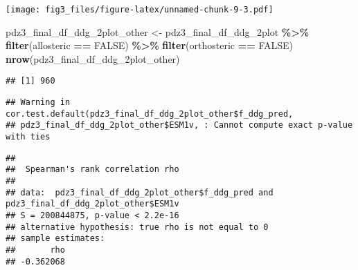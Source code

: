 \documentclass[
]{article}
\newenvironment{Shaded}{\begin{snugshade}}{\end{snugshade}}
\newcommand{\AttributeTok}[1]{\textcolor[rgb]{0.13,0.29,0.53}{#1}}
\newcommand{\CommentTok}[1]{\textcolor[rgb]{0.56,0.35,0.01}{\textit{#1}}}
\newcommand{\ConstantTok}[1]{\textcolor[rgb]{0.56,0.35,0.01}{#1}}
\newcommand{\FunctionTok}[1]{\textcolor[rgb]{0.13,0.29,0.53}{\textbf{#1}}}
\newcommand{\NormalTok}[1]{#1}
\newcommand{\OtherTok}[1]{\textcolor[rgb]{0.56,0.35,0.01}{#1}}
\newcommand{\SpecialCharTok}[1]{\textcolor[rgb]{0.81,0.36,0.00}{\textbf{#1}}}
\newcommand{\StringTok}[1]{\textcolor[rgb]{0.31,0.60,0.02}{#1}}
\begin{document}
\texttt{[image: fig3\_files/figure-latex/unnamed-chunk-9-3.pdf]}

\begin{Shaded}
\begin{Highlighting}[]
\NormalTok{pdz3\_final\_df\_ddg\_2plot\_other }\OtherTok{\textless{}{-}}\NormalTok{ pdz3\_final\_df\_ddg\_2plot }\SpecialCharTok{\%\textgreater{}\%} \FunctionTok{filter}\NormalTok{(allosteric }\SpecialCharTok{==} \ConstantTok{FALSE}\NormalTok{) }\SpecialCharTok{\%\textgreater{}\%} \FunctionTok{filter}\NormalTok{(orthosteric }\SpecialCharTok{==} \ConstantTok{FALSE}\NormalTok{)}
\FunctionTok{nrow}\NormalTok{(pdz3\_final\_df\_ddg\_2plot\_other)}
\end{Highlighting}
\end{Shaded}

\begin{verbatim}
## [1] 960
\end{verbatim}

\begin{Shaded}
\end{Shaded}

\begin{verbatim}
## Warning in cor.test.default(pdz3_final_df_ddg_2plot_other$f_ddg_pred,
## pdz3_final_df_ddg_2plot_other$ESM1v, : Cannot compute exact p-value with ties
\end{verbatim}

\begin{verbatim}
## 
##  Spearman's rank correlation rho
## 
## data:  pdz3_final_df_ddg_2plot_other$f_ddg_pred and pdz3_final_df_ddg_2plot_other$ESM1v
## S = 200844875, p-value < 2.2e-16
## alternative hypothesis: true rho is not equal to 0
## sample estimates:
##       rho 
## -0.362068
\end{verbatim}
\end{document}
